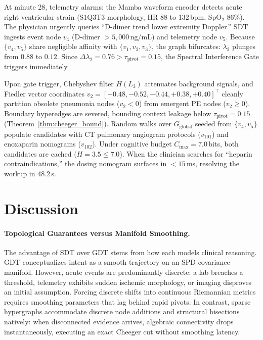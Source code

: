 \documentclass[10pt, onecolumn]{article}
\begin{document}
At minute 28, telemetry alarms: the Mamba waveform encoder detects acute right ventricular strain (S1Q3T3 morphology, HR 88 to 132\,bpm, SpO$_2$ 86\%). The physician urgently queries ``D-dimer trend lower extremity Doppler.'' SDT ingests event node $v_4$ (D-dimer $>5{,}000\,\text{ng/mL}$) and telemetry node $v_5$. Because $\{v_4, v_5\}$ share negligible affinity with $\{v_1, v_2, v_3\}$, the graph bifurcates: $\lambda_2$ plunges from $0.88$ to $0.12$. Since $\Delta \lambda_2 = 0.76 > \tau_{\text{pivot}} = 0.15$, the Spectral Interference Gate triggers immediately.

Upon gate trigger, Chebyshev filter $H(L_3)$ attenuates background signals, and Fiedler vector coordinates $v_2 = [-0.48, -0.52, -0.44, +0.38, +0.40]^\top$ cleanly partition obsolete pneumonia nodes ($v_2 < 0$) from emergent PE nodes ($v_2 \ge 0$). Boundary hyperedges are severed, bounding context leakage below $\tau_{\text{pivot}} = 0.15$ (Theorem~\ref{thm:cheeger_bound}). Random walks over $G_{\text{global}}$ seeded from $\{v_4, v_5\}$ populate candidates with CT pulmonary angiogram protocols ($v_{101}$) and enoxaparin nomograms ($v_{102}$). Under cognitive budget $C_{\max} = 7.0$\,bits, both candidates are cached ($H=3.5 \le 7.0$). When the clinician searches for ``heparin contraindications,'' the dosing nomogram surfaces in $<15$\,ms, resolving the workup in 48.2\,s.

\section{Discussion}
\label{sec:discussion}

\paragraph{Topological Guarantees versus Manifold Smoothing.}
The advantage of SDT over GDT stems from how each models clinical reasoning. GDT conceptualizes intent as a smooth trajectory on an SPD covariance manifold. However, acute events are predominantly discrete: a lab breaches a threshold, telemetry exhibits sudden ischemic morphology, or imaging disproves an initial assumption. Forcing discrete shifts into continuous Riemannian metrics requires smoothing parameters that lag behind rapid pivots. In contrast, sparse hypergraphs accommodate discrete node additions and structural bisections natively: when disconnected evidence arrives, algebraic connectivity drops instantaneously, executing an exact Cheeger cut without smoothing latency.
\end{document}
